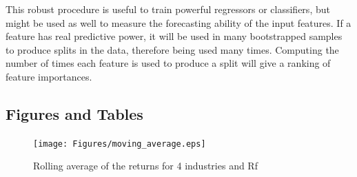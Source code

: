 \documentclass[12pt]{article} %
\numberwithin{equation}{subsection}
\begin{document}
This robust procedure is useful to train powerful regressors or classifiers, but might be used as well to measure the forecasting ability of the input features. If a feature has real predictive power, it will be used in many bootstrapped samples to produce splits in the data, therefore being used many times. Computing the number of times each feature is used to produce a split will give a ranking of feature importances.\\

\newpage
\subsection*{Figures and Tables}

\begin{figure}[htbp]
	\centering
	\texttt{[image: Figures/moving\_average.eps]}
	\caption{Rolling average of the returns for 4 industries and Rf}
	\label{rolling_average}
\end{figure}








\clearpage

\begin {table}[htbp]
\begin{center}

\end{center}
\caption {Descriptive statistics for simple returns} \label{industry_summary} 
\end {table}



\newpage

 

\end{document}
